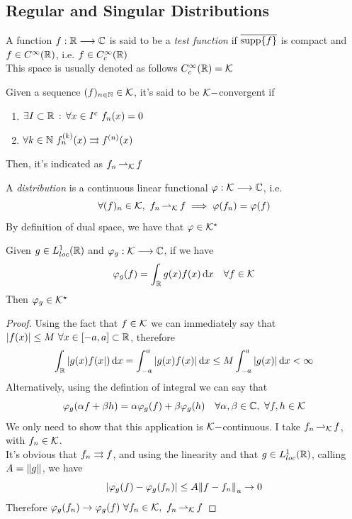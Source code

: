 \documentclass[../complete.tex]{subfiles}
\begin{document}
\subsection{Regular and Singular Distributions}
\begin{dfn}
	A function $f:\mathbb{R}\overset{}{\longrightarrow}\mathbb{C}$ is said to be a \textit{test function} if $\overline{\operatorname{supp}\{f\}}$ is compact and $f\in C^\infty(\mathbb{R})$, i.e. $f\in C_c^\infty(\mathbb{R})$\\
	This space is usually denoted as follows $C^\infty_c(\mathbb{R})=\mathcal{K}$
\end{dfn}
\begin{dfn}[$\K$-convergence]
	Given a sequence $(f)_{n\in\mathbb{N}}\in\mathcal{K}$, it's said to be $\mathcal{K}-$convergent if
	\begin{enumerate}
	\item $\exists I\subset\mathbb{R}\, :\, \forall x\in I^{\mathrm{c}}\ f_n(x)=0$
	\item $\forall k\in\mathbb{N}\ f^{(k)}_n(x)\rightrightarrows f^{(n)}(x) $
	\end{enumerate}
	Then, it's indicated as $f_n\operatorname{\rightharpoonup_{\mathcal{K}}} f$
\end{dfn}
\begin{dfn}[Distribution]
	A \textit{distribution} is  a continuous linear functional $\varphi:\mathcal{K}\overset{}{\longrightarrow}\mathbb{C}$, i.e.
	\begin{equation*}
		\forall(f)_n\in\mathcal{K},\ f_n\operatorname{\rightharpoonup_{\mathcal{K}}} f\implies{}\varphi(f_n)=\varphi(f)
	\end{equation*}
	By definition of dual space, we have that $\varphi\in\mathcal{K}^\star$
\end{dfn}
\begin{thm}
	Given $g\in L^1_{loc}(\mathbb{R})$ and $\varphi_g:\mathcal{K}\overset{}{\longrightarrow}\mathbb{C}$, if we have
	\begin{equation*}
		\varphi_g(f)=\int_{\mathbb{R}}^{}g(x)f(x)\operatorname{d\!} x\quad\forall f\in\mathcal{K}
	\end{equation*}
	Then $\varphi_g\in\mathcal{K}^\star$
\end{thm}
\begin{proof}
	Using the fact that $f\in\mathcal{K}$ we can immediately say that $\abs{f(x)}\le M\ \forall x\in[-a,a]\subset\mathbb{R}$, therefore
	\begin{equation*}
		\int_{\mathbb{R}}^{}\abs{g(x)f(x})\operatorname{d\!} x=\int_{-a}^{a}\abs{g(x)f(x)}\operatorname{d\!} x\le M\int_{-a}^{a}\abs{g(x)}\operatorname{d\!} x<\infty
	\end{equation*}
	Alternatively, using the defintion of integral we can say that
	\begin{equation*}
		\varphi_g(\alpha f+\beta h)=\alpha\varphi_g(f)+\beta\varphi_g(h)\quad\forall\alpha,\beta\in\Cf,\ \forall f,h\in\K
	\end{equation*}
	We only need to show that this application is $\mathcal{K}-$continuous. I take $f_n\operatorname{\rightharpoonup_{\mathcal{K}}} f$, with $f_n\in\mathcal{K}$.\\
	It's obvious that $f_n\rightrightarrows f$, and using the linearity and that $g\in L^1_{loc}(\mathbb{R})$, calling $A=\norm{g}$, we have
	\begin{equation*}
		\abs{\varphi_g(f)-\varphi_g(f_n)}\le A\norm{f-f_n}_u\to0
	\end{equation*}
	Therefore $\varphi_g(f_n)\to\varphi_g(f)\ \forall f_n\in\K,\ f_n\kto f$
\end{proof}
\end{document}
